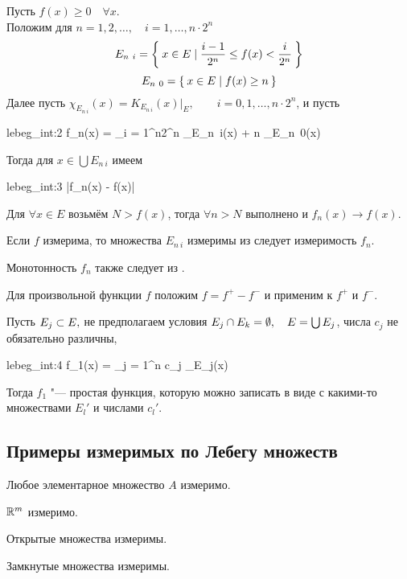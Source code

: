 \begin{eproof}
	\item Пусть $ f(x) \ge 0 \quad \forall x $. \\
		Положим для $ n = 1, 2, \dots, \quad i = 1, \dots, n \cdot 2^n $
		$$ E_{n~i} = \Set{x \in E \mid \frac{i - 1}{2^n} \le f(x) < \frac i{2^n}} $$
		$$ E_{n~0} = \Set{x \in E \mid f(x) \ge n} $$
		Далее пусть $ \chi_{E_{n~i}}(x) = K_{E_{n~i}}(x) \big|_E, \qquad i = 0, 1, \dots, n \cdot 2^n $, и пусть
		\begin{equ}{lebeg_int:2}
			f_n(x) = \sum_{i = 1}^{n2^n}  \chi_{E_{n~i}}(x) + n \chi_{E_{n~0}}(x)
		\end{equ}
		Тогда для $ x \in \bigcup E_{n~i} $ имеем
		\begin{equ}{lebeg_int:3}
			|f_n(x) - f(x)| \le {}
		\end{equ}
		Для $ \forall x \in E $ возьмём $ N > f(x) $, тогда $ \forall n > N $ выполнено  и $ f_n(x) \to f(x) $.

	\item Если $ f $ измерима, то множества $ E_{n~i} $ измеримы из  следует измеримость $ f_n $.

	\item Монотонность $ f_n $ также следует из .

	\item Для произвольной функции $ f $ положим $ f = f^+ - f^- $ и  применим к $ f^+ $ и $ f^- $.
\end{eproof}

\begin{remark}
	Пусть $ E_j \subset E, $ не предполагаем условия $ E_j \cap E_k = \emptyset, \quad E = \bigcup E_j $, числа $ c_j $ не обязательно различны,
	\begin{equ}{lebeg_int:4}
		f_1(x) = \sum_{j = 1}^n c_j \chi_{E_j}(x)
	\end{equ}

	Тогда $ f_1 $ "--- простая функция, которую можно записать в виде  с какими-то множествами $ E_l' $ и числами $ c_l' $.
\end{remark}

\subsection{Примеры измеримых по Лебегу множеств}

\begin{exmpls}
	\item Любое элементарное множество $ A $ измеримо.
	\item $ \mathbb{R}^m $ измеримо.
	\item Открытые множества измеримы.
	\item Замкнутые множества измеримы.
\end{exmpls}

